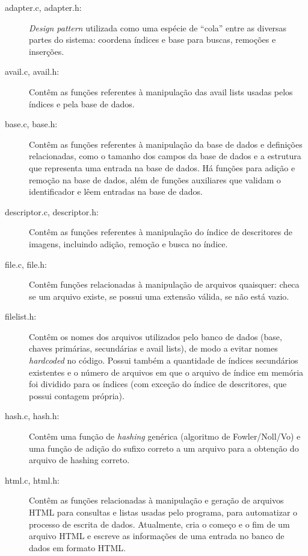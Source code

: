 \documentclass[a4paper,10pt]{article}
\begin{document}
\begin{description}
\item[adapter.c, adapter.h:] \textit{Design pattern} utilizada como uma espécie de ``cola'' entre as diversas partes do sistema: coordena índices e base para buscas, remoções e inserções.

\item[avail.c, avail.h:] Contêm as funções referentes à manipulação das avail lists usadas pelos índices e pela base de dados.

\item[base.c, base.h:] Contêm as funções referentes à manipulação da base de dados e definições relacionadas, como o tamanho dos campos da base de dados e a estrutura que representa uma entrada na base de dados. Há funções para adição e remoção na base de dados, além de funções auxiliares que validam o identificador e lêem entradas na base de dados.

\item[descriptor.c, descriptor.h:] Contêm as funções referentes à manipulação do índice de descritores de imagens, incluindo adição, remoção e busca no índice.

 \item[file.c, file.h:] Contêm funções relacionadas à manipulação de arquivos quaisquer: checa se um arquivo existe, se possui uma extensão válida, se não está vazio.

\item[filelist.h:] Contêm os nomes dos arquivos utilizados pelo banco de dados (base, chaves primárias, secundárias e avail lists), de modo a evitar nomes \textit{hardcoded} no código. Possui também a quantidade de índices secundários existentes e o número de arquivos em que o arquivo de índice em memória foi dividido para os índices (com exceção do índice de descritores, que possui contagem própria).

\item[hash.c, hash.h:] Contêm uma função de \textit{hashing} genérica (algoritmo de Fowler/Noll/Vo) e uma função de adição do sufixo correto a um arquivo para a obtenção do arquivo de hashing correto.

\item[html.c, html.h:] Contêm as funções relacionadas à manipulação e geração de arquivos HTML para consultas e listas usadas pelo programa, para automatizar o processo de escrita de dados. Atualmente, cria o começo e o fim de um arquivo HTML e escreve as informações de uma entrada no banco de dados em formato HTML.


\end{description}
\end{document}
